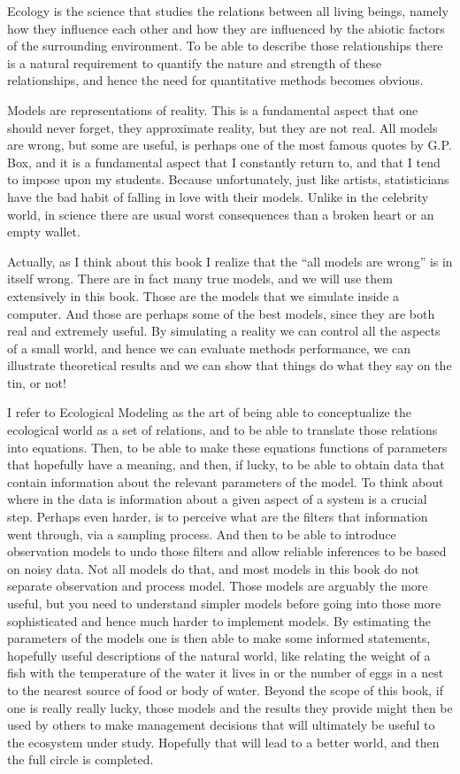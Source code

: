 \documentclass[
]{book}
\begin{document}
Ecology is the science that studies the relations between all living beings, namely how they influence each other and how they are influenced by the abiotic factors of the surrounding environment. To be able to describe those relationships there is a natural requirement to quantify the nature and strength of these relationships, and hence the need for quantitative methods becomes obvious.

Models are representations of reality. This is a fundamental aspect that one should never forget, they approximate reality, but they are not real. All models are wrong, but some are useful, is perhaps one of the most famous quotes by G.P. Box, and it is a fundamental aspect that I constantly return to, and that I tend to impose upon my students. Because unfortunately, just like artists, statisticians have the bad habit of falling in love with their models. Unlike in the celebrity world, in science there are usual worst consequences than a broken heart or an empty wallet.

Actually, as I think about this book I realize that the ``all models are wrong'' is in itself wrong. There are in fact many true models, and we will use them extensively in this book. Those are the models that we simulate inside a computer. And those are perhaps some of the best models, since they are both real and extremely useful. By simulating a reality we can control all the aspects of a small world, and hence we can evaluate methods performance, we can illustrate theoretical results and we can show that things do what they say on the tin, or not!

I refer to Ecological Modeling as the art of being able to conceptualize the ecological world as a set of relations, and to be able to translate those relations into equations. Then, to be able to make these equations functions of parameters that hopefully have a meaning, and then, if lucky, to be able to obtain data that contain information about the relevant parameters of the model. To think about where in the data is information about a given aspect of a system is a crucial step. Perhaps even harder, is to perceive what are the filters that information went through, via a sampling process. And then to be able to introduce observation models to undo those filters and allow reliable inferences to be based on noisy data. Not all models do that, and most models in this book do not separate observation and process model. Those models are arguably the more useful, but you need to understand simpler models before going into those more sophisticated and hence much harder to implement models. By estimating the parameters of the models one is then able to make some informed statements, hopefully useful descriptions of the natural world, like relating the weight of a fish with the temperature of the water it lives in or the number of eggs in a nest to the nearest source of food or body of water. Beyond the scope of this book, if one is really really lucky, those models and the results they provide might then be used by others to make management decisions that will ultimately be useful to the ecosystem under study. Hopefully that will lead to a better world, and then the full circle is completed.
\end{document}
